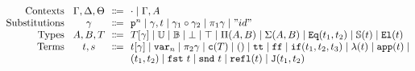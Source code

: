 
\renewcommand{\Rule}[3][]{
    \pgfkeys{/Rule, default, #1}%
    \ifthenelse{\equal{\inferrulevskip}{default}}{%
        \mprset{vskip=}%
    }{%
        \mprset{vskip=\inferrulevskip}
    }%
    \ifthenelse{\equal{\inferrulesep}{default}}{%
        \mprset{sep=3ex}%
    }{%
        \mprset{sep=\inferrulesep}
    }%
        \ensuremath{\inferrule{#2}{#3}}%
}

\newcommand{\RuleWithName}[3][]{
    \pgfkeys{/Rule, default, #1}%
    \ifthenelse{\equal{\inferrulevskip}{default}}{%
        \mprset{vskip=}%
    }{%
        \mprset{vskip=\inferrulevskip}
    }%
    \ifthenelse{\equal{\inferrulesep}{default}}{%
        \mprset{sep=3ex}%
    }{%
        \mprset{sep=\inferrulesep}
    }%
    \ifthenelse{\equal{\inferrulename}{0}}{%
        \ensuremath{\inferrule{#2}{#3}}%
    }{%
        \ifthenelse{\equal{\inferrulelabel}{0}}{\ensuremath{%
            \inferrule*[lab={\rulelbl{\inferrulename}}]{#2}{#3}
        }}{\ensuremath{%
            \inferrule*[lab={\rulelbl[\inferrulelabel]{\inferrulename}}]{#2}{#3}
        }}%
    }%
}



\begin{gather*}
  \begin{array}{@{}r@{\hspace{2ex}}c@{\ \ }c@{\ \ }l@{}}
  \text{Contexts} & \Gm, \Dl, \Theta &\Coloneqq &
      \cdot \mid \Gm, A
      \\ 
  \text{Substitutions} & \gm &\Coloneqq &
      \SubstWeak{n} \mid \SubstExt{\gm}{t} \mid \SubstComp{\gm_1}{\gm_2} \mid \pi_1 \gm \mid "id"
      \\
  \text{Types} & A, B, T  &\Coloneqq &
      \sub{T}{\gm} \mid
      \cU \mid \cB \mid \bot \mid \top \mid \TyPi{A}{B} \mid \TySigma{A}{B} \mid \TyId{t_1}{t_2} \mid \TyS{t} \mid \El{t}
      \\
  \text{Terms} & t, s &\Coloneqq &
      \sub{t}{\gm} \mid \var{n} \mid \pi_2 \gm \mid \codety{T} \mid \unit \mid \true \mid \false \mid \ifb{t_1}{t_2}{t_3} \mid \lam{t} \mid \app{t} \mid
      \\ &&&
      \pair{t_1}{t_2} \mid \fst{t} \mid \snd{t} \mid \eqrefl{t} \mid  \Jeq{t_1}{t_2}
  \end{array}
\end{gather*}
  

